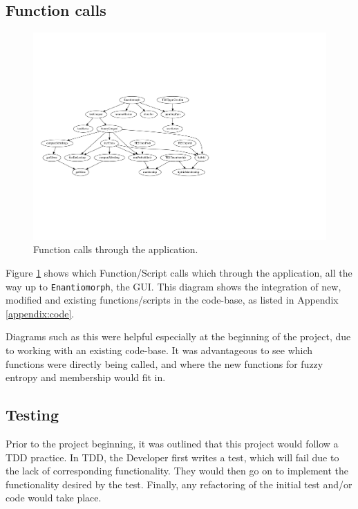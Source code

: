 \subsection{Function calls}

\begin{figure}[H]
  \centering
  \includegraphics[width=\textwidth,clip,trim=0mm 50mm 110mm 50mm]{Chapter2/software-img/function_call_1.pdf}
  \caption{Function calls through the application.}
  \label{fig:data-flow}
\end{figure}

Figure \ref{fig:data-flow} shows which Function/Script calls which through the application, all the way up to \texttt{Enantiomorph}, the \acrshort{GUI}. This diagram shows the integration of new, modified and existing functions/scripts in the code-base, as listed in Appendix \ref{appendix:code}.

Diagrams such as this were helpful especially at the beginning of the project, due to working with an existing code-base. It was advantageous to see which functions were directly being called, and where the new functions for fuzzy entropy and membership would fit in.

\subsection{Testing}

Prior to the project beginning, it was outlined that this project would follow a \acrshort{TDD} practice. In \acrshort{TDD}, the Developer first writes a test, which will fail due to the lack of corresponding functionality. They would then go on to implement the functionality desired by the test. Finally, any refactoring of the initial test and/or code would take place.

